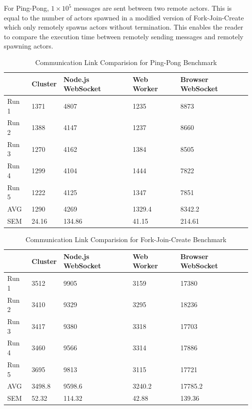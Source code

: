 \documentclass[oneside]{um-fict}
\begin{document}
For Ping-Pong, $1\times10^5$ messages are sent between two remote actors. This is equal to the number of actors spawned in a modified version of Fork-Join-Create which only remotely spawns actors without termination. This enables the reader to compare the execution time between remotely sending messages and remotely spawning actors.
\begin{table}[H]
    \begin{center}
        \begin{tabular}{|l|llll|}
        \hline
        & Cluster & Node.js WebSocket & Web Worker & Browser WebSocket \\ \hline
        Run 1 & 1371    & 4807              & 1235       & 8873              \\
        Run 2 & 1388    & 4147              & 1237       & 8660              \\
        Run 3 & 1270    & 4162              & 1384       & 8505              \\
        Run 4 & 1299    & 4104              & 1444       & 7822              \\
        Run 5 & 1222    & 4125              & 1347       & 7851              \\ \hline
        AVG   & 1290    & 4269              & 1329.4     & 8342.2            \\
        SEM   & 24.16   & 134.86            & 41.15      & 214.61            \\ \hline
        \end{tabular}
        \caption{Communication Link Comparision for Ping-Pong Benchmark}\label{tab:pingpongcomms}
    \end{center}
\end{table}
\begin{table}[H]
    \begin{center}
        \begin{tabular}{|l|llll|}
        \hline
        & Cluster & Node.js WebSocket & Web Worker & Browser WebSocket \\ \hline
        Run 1 & 3512    & 9905              & 3159       & 17380             \\
        Run 2 & 3410    & 9329              & 3295       & 18236             \\
        Run 3 & 3417    & 9380              & 3318       & 17703             \\
        Run 4 & 3460    & 9566              & 3314       & 17886             \\
        Run 5 & 3695    & 9813              & 3115       & 17721             \\ \hline
        AVG   & 3498.8  & 9598.6            & 3240.2     & 17785.2           \\
        SEM   & 52.32   & 114.32            & 42.88      & 139.36            \\ \hline
        \end{tabular}
        \caption{Communication Link Comparision for Fork-Join-Create Benchmark}\label{tab:fjcreatecomms}
    \end{center}
\end{table}
\end{document}
